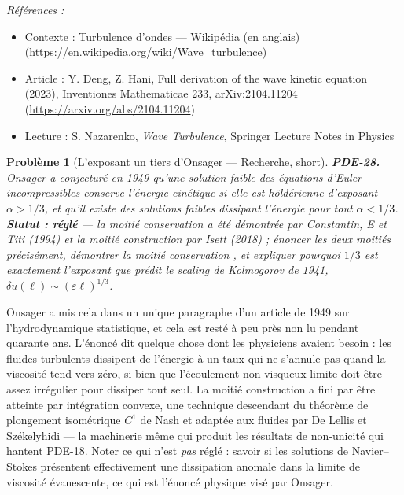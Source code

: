 \documentclass[11pt]{article}
\newtheorem{problem}{Problème}
\newenvironment{refs}{\par\small\noindent\emph{Références :}\begin{itemize}\setlength\itemsep{0pt}}{\end{itemize}\normalsize}
\begin{document}
\begin{refs}
\item Contexte : Turbulence d'ondes --- Wikipédia (en anglais) (\url{https://en.wikipedia.org/wiki/Wave_turbulence})
\item Article : Y. Deng, Z. Hani, \og{} Full derivation of the wave kinetic equation \fg{} (2023), Inventiones Mathematicae 233, arXiv:2104.11204 (\url{https://arxiv.org/abs/2104.11204})
\item Lecture : S. Nazarenko, \textit{Wave Turbulence}, Springer Lecture Notes in Physics
\end{refs}

\bigskip

\begin{problem}[{L'exposant un tiers d'Onsager --- Recherche, short}]
\textbf{PDE-28.} Onsager a conjecturé en 1949 qu'une solution
faible des équations d'Euler incompressibles conserve l'énergie cinétique si elle est
höldérienne d'exposant $\alpha > 1/3$, et qu'il existe des solutions faibles dissipant
l'énergie pour tout $\alpha < 1/3$. \textbf{Statut : réglé} --- la moitié
\og{} conservation \fg{} a été démontrée par Constantin, E et Titi (1994) et la moitié
\og{} construction \fg{} par Isett (2018) ; énoncer les deux moitiés précisément, démontrer la moitié
\og{} conservation \fg{}, et expliquer pourquoi $1/3$ est exactement l'exposant que prédit le
scaling de Kolmogorov de 1941, $\delta u(\ell) \sim (\varepsilon\ell)^{1/3}$.
\end{problem}

\noindent Onsager a mis cela dans un unique paragraphe d'un article de 1949 sur
l'hydrodynamique statistique, et cela est resté à peu près non lu pendant quarante ans. L'énoncé
dit quelque chose dont les physiciens avaient besoin : les fluides turbulents dissipent de
l'énergie à un taux qui ne s'annule pas quand la viscosité tend vers zéro, si bien que
l'écoulement non visqueux limite doit être assez irrégulier pour dissiper tout seul. La moitié
\og{} construction \fg{} a fini par être atteinte par intégration convexe, une technique descendant du
théorème de plongement isométrique $C^1$ de Nash et adaptée aux fluides par De Lellis et
Székelyhidi --- la machinerie même qui produit les résultats de non-unicité qui hantent PDE-18.
Noter ce qui n'est \textit{pas} réglé : savoir si les solutions de Navier--Stokes présentent
effectivement une dissipation anomale dans la limite de viscosité évanescente, ce qui est
l'énoncé physique visé par Onsager.
\end{document}
